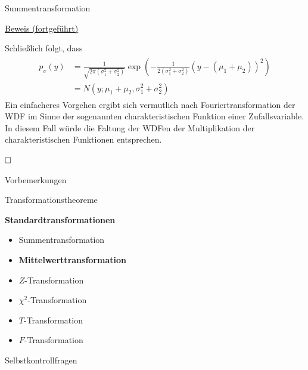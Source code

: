 \documentclass[
  8pt,
  ignorenonframetext,
]{beamer}
\providecommand{\tightlist}{%
  \setlength{\itemsep}{0pt}\setlength{\parskip}{0pt}}
\newcommand{\ups}{\upsilon}
\begin{document}
\begin{frame}{Summentransformation}
\protect\hypertarget{summentransformation-5}{}
\footnotesize

\underline{Beweis (fortgeführt)} \vspace{2mm}

Schließlich folgt, dass \begin{align}
\begin{split}
p_\ups(y)
& = \frac{1}{\sqrt{2\pi(\sigma_1^2 + \sigma_2^2)}}
  \exp\left(-\frac{1}{2(\sigma_1^2 + \sigma_2^2)}\left(y - (\mu_1 + \mu_2)\right)^2\right) \\
& = N(y; \mu_1 + \mu_2, \sigma_1^2 + \sigma_2^2)
\end{split}
\end{align} Ein einfacheres Vorgehen ergibt sich vermutlich nach
Fouriertransformation der WDF im Sinne der sogenannten
charakteristischen Funktion einer Zufallsvariable. In diesem Fall würde
die Faltung der WDFen der Multiplikation der charakteristischen
Funktionen entsprechen.

\(\hfill \Box\)
\end{frame}

\begin{frame}{}
\protect\hypertarget{section-7}{}
\large

Vorbemerkungen

Transformationstheoreme

\textbf{Standardtransformationen}

\normalsize

\begin{itemize}
\tightlist
\item
  Summentransformation
\item
  \textbf{Mittelwerttransformation}
\item
  \(Z\)-Transformation
\item
  \(\chi^2\)-Transformation
\item
  \(T\)-Transformation
\item
  \(F\)-Transformation
\end{itemize}

\large

Selbstkontrollfragen
\end{frame}
\end{document}
